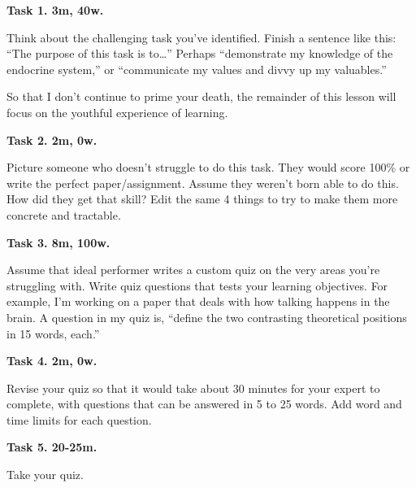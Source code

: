 \documentclass[
]{book}
\begin{document}
\textbf{Task 1. 3m, 40w.}

Think about the challenging task you've identified.
Finish a sentence like this:
``The purpose of this task is to\ldots{}''
Perhaps ``demonstrate my knowledge of the endocrine system,'' or
``communicate my values and divvy up my valuables.''

So that I don't continue to prime your death, the remainder of this lesson will focus on the youthful experience of learning.

\textbf{Task 2. 2m, 0w.}

Picture someone who doesn't struggle to do this task.
They would score 100\% or write the perfect paper/assignment.
Assume they weren't born able to do this.
How did they get that skill?
Edit the same 4 things to try to make them more concrete and tractable.

\textbf{Task 3. 8m, 100w.}

Assume that ideal performer writes a custom quiz on
the very areas you're struggling with.
Write quiz questions that tests your learning objectives.
For example, I'm working on a paper that deals with
how talking happens in the brain.
A question in my quiz is, ``define the two contrasting theoretical
positions in 15 words, each.''

\textbf{Task 4. 2m, 0w.}

Revise your quiz so that it would take about 30 minutes for your expert to complete, with questions that can be answered in 5 to 25 words.
Add word and time limits for each question.

\textbf{Task 5. 20-25m.}

Take your quiz.

  
\end{document}
